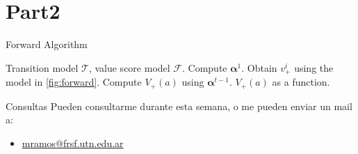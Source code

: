 \documentclass{beamer}
\begin{document}
\section{Part2}


\begin{frame}[fragile]{Forward Algorithm}
\begin{algorithm}[H]%
\small
\caption{Forward algorithm.}
\label{alg:algorithm}
\begin{algorithmic}%

\REQUIRE Transition model $\mathcal{T}$, value score model $\mathcal{F}$.
\STATE Compute $\bm{\alpha}^1$.
    \STATE Obtain $v_+^i$ using the model in \ref{fig:forward}.
        \STATE Compute $V_+(a)$ using $\bm{\alpha}^{t-1}$.
    \ENDIF
\ENDFOR
\RETURN $V_+(a)$ as a function.

\end{algorithmic}
\end{algorithm}
\end{frame}


\begin{frame}{Consultas}
Pueden consultarme durante esta semana, o me pueden enviar un mail a:
        \begin{itemize}
            \item \href{mailto:mramos@frsf.utn.edu.ar}{mramos@frsf.utn.edu.ar}
        \end{itemize}
\end{frame}
\end{document}
